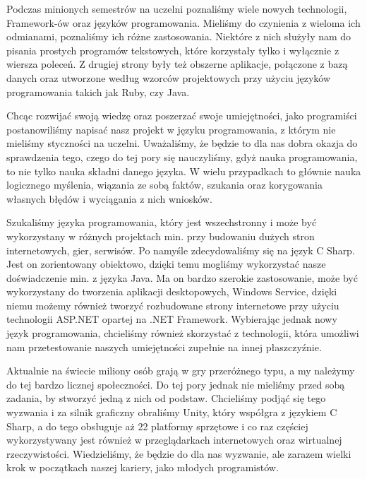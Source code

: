 \documentclass[openright]{xmgr}
\begin{document}

\maketitle

\introduction

  Podczas minionych semestrów na uczelni poznaliśmy wiele nowych technologii, Framework-ów oraz języków programowania. Mieliśmy do czynienia z wieloma ich odmianami, poznaliśmy ich różne zastosowania. Niektóre z nich służyły nam do pisania prostych programów tekstowych, które korzystały tylko i wyłącznie z wiersza poleceń. Z drugiej strony były też obszerne aplikacje, połączone z bazą danych oraz utworzone według wzorców projektowych przy użyciu  języków programowania takich jak Ruby, czy Java. 

  Chcąc rozwijać swoją wiedzę oraz poszerzać swoje umiejętności, jako programiści postanowiliśmy napisać nasz projekt w języku programowania, z którym nie mieliśmy styczności na uczelni. Uważaliśmy, że będzie to dla nas dobra okazja do sprawdzenia tego, czego do tej pory się nauczyliśmy, gdyż nauka programowania, to nie tylko nauka składni danego języka. W wielu przypadkach to głównie nauka logicznego myślenia, wiązania ze sobą faktów, szukania oraz korygowania własnych błędów i wyciągania z nich wniosków. 

  Szukaliśmy języka programowania, który jest wszechstronny i może być wykorzystany w różnych projektach min. przy budowaniu dużych stron internetowych, gier, serwisów. Po namyśle zdecydowaliśmy się na język C Sharp. Jest on zorientowany obiektowo, dzięki temu mogliśmy wykorzystać nasze doświadczenie min. z języka Java.  Ma on bardzo szerokie zastosowanie, może być wykorzystany do tworzenia aplikacji desktopowych, Windows Service, dzięki niemu możemy również tworzyć rozbudowane strony internetowe przy użyciu technologii ASP.NET opartej na .NET Framework. Wybierając jednak nowy język programowania, chcieliśmy również skorzystać z technologii, która umożliwi nam przetestowanie naszych umiejętności zupełnie na innej płaszczyźnie.

  Aktualnie na świecie miliony osób grają w gry przeróżnego typu, a my należymy do tej bardzo licznej społeczności. Do tej pory jednak nie mieliśmy przed sobą zadania, by stworzyć jedną z nich od podstaw. Chcieliśmy podjąć się tego wyzwania i za silnik graficzny obraliśmy Unity, który współgra z językiem C Sharp, a do tego obsługuje aż 22 platformy sprzętowe i co raz częściej wykorzystywany jest również w przeglądarkach internetowych oraz wirtualnej rzeczywistości. Wiedzieliśmy, że będzie do dla nas wyzwanie, ale zarazem wielki krok w początkach naszej kariery, jako młodych programistów.
\end{document}
